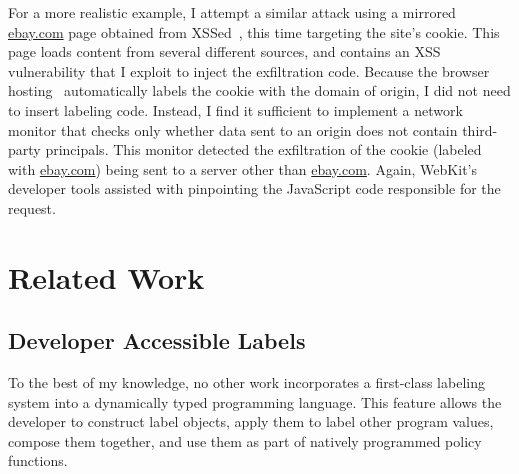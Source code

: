 For a more realistic example, I attempt a similar attack using a mirrored \url{ebay.com} page obtained from XSSed~\cite{xssed}, this time targeting the site's cookie.
This page loads content from several different sources, and contains an XSS vulnerability that I exploit to inject the exfiltration code.
Because the browser hosting \FlowCore\ automatically labels the cookie with the domain of origin, I did not need to insert labeling code.
Instead, I find it sufficient to implement a network monitor that checks only whether data sent to an origin does not contain third-party principals.
This monitor detected the exfiltration of the cookie (labeled with \url{ebay.com}) being sent to a server other than \url{ebay.com}.
Again, WebKit's developer tools assisted with pinpointing the JavaScript code responsible for the request.



\section{Related Work}

\subsection{Developer Accessible Labels}

To the best of my knowledge, no other work incorporates a first-class labeling system into a dynamically typed programming language.
This feature allows the developer to construct label objects, apply them to label other program values, compose them together, and use them as part of natively programmed policy functions.


